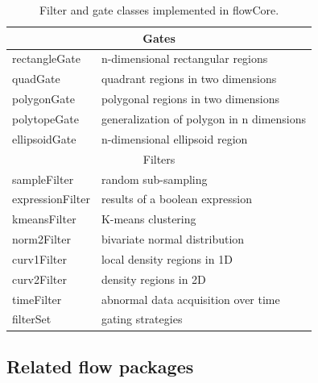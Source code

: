 \documentclass[12pt]{article}
\newcommand{\Rpackage}[1]{{\textsf{#1}}}
\begin{document}
\begin{table}[ht]
\begin{center}
\begin{tabular}{|l|l|}
\hline
\multicolumn{2}{|c|}{Gates} \\
\hline
rectangleGate & n-dimensional rectangular regions \\
quadGate & quadrant regions in two dimensions \\
polygonGate & polygonal regions in two dimensions \\
polytopeGate & generalization of polygon in n dimensions \\
ellipsoidGate & n-dimensional ellipsoid region \\
\hline
\multicolumn{2}{|c|}{Filters} \\
\hline
sampleFilter & random sub-sampling\\
expressionFilter & results of a boolean expression \\
kmeansFilter & K-means clustering \\
norm2Filter & bivariate normal distribution \\
curv1Filter & local density regions in 1D \\
curv2Filter & density regions in 2D \\
timeFilter & abnormal data acquisition over time \\
\hline
filterSet & gating strategies \\
\hline
\end{tabular}
\caption{\label{table2}Filter and gate classes implemented in
  \Rpackage{flowCore}.}
\end{center}
\end{table}

\subsection*{Related flow packages}
\end{document}
